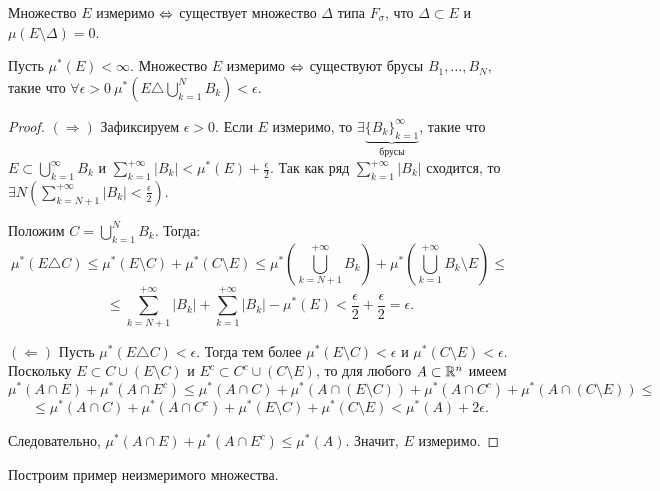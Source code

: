 \begin{note}
    Множество $E$ измеримо $\Leftrightarrow$ существует множество $\Delta$ типа $F_{\sigma}$, что $\Delta \subset E$ и $\mu(E \setminus \Delta) = 0$.
\end{note}

\begin{theorem}
    Пусть $\mu^{*}(E) < \infty$. Множество $E$ измеримо $\Leftrightarrow$ существуют брусы $B_{1}, \ldots, B_{N}$, такие что $\forall \epsilon > 0 \ \mu^{*}(E \triangle \bigcup_{k = 1}^{N} B_{k}) < \epsilon$.
\end{theorem}

\begin{proof}

    $(\Rightarrow)$ Зафиксируем $\epsilon > 0$. Если $E$ измеримо, то $\exists \underbrace{\{B_{k}\}_{k = 1}^{\infty}}_{\text{брусы}}$, такие что $E \subset \bigcup_{k = 1}^{\infty}B_{k}$ и $\sum_{k = 1}^{+\infty}|B_{k}| < \mu^{*}(E) + \frac{\epsilon}{2}$. Так как ряд $\sum_{k = 1}^{+\infty}|B_{k}|$ сходится, то $\exists N \left(\sum_{k = N + 1}^{+\infty}|B_{k}| < \frac{\epsilon}{2}\right)$.

    Положим $C = \bigcup_{k = 1}^{N} B_{k}$. Тогда:
    \[\mu^{*}(E \triangle C) \leq \mu^{*}(E \setminus C) + \mu^{*}(C \setminus E) \leq \mu^{*}\left(\bigcup_{k = N + 1}^{+\infty}B_{k}\right) + \mu^{*}\left(\bigcup_{k = 1}^{+\infty}B_{k} \setminus E\right) \leq\]
    \[\leq \sum_{k = N + 1}^{+\infty}|B_{k}| + \sum_{k = 1}^{+\infty}|B_{k}| - \mu^{*}(E) < \frac{\epsilon}{2} + \frac{\epsilon}{2} = \epsilon.\]

    $(\Leftarrow)$ Пусть $\mu^{*}(E \triangle C) < \epsilon$. Тогда тем более $\mu^{*}(E \setminus C) < \epsilon$ и $\mu^{*}(C \setminus E) < \epsilon$. Поскольку $E \subset C \cup (E \setminus C)$ и $E^{c} \subset C^{c} \cup (C \setminus E)$, то для любого $A \subset \mathbb{R}^{n}$ имеем
    \[\mu^{*}(A \cap E) + \mu^{*}(A \cap E^{c}) \leq \mu^{*}(A \cap C) + \mu^{*}(A \cap (E \setminus C)) + \mu^{*}(A \cap C^{c}) + \mu^{*}(A \cap (C \setminus E)) \leq\]
    \[\leq \mu^{*}(A \cap C) + \mu^{*}(A \cap C^{c}) + \mu^{*}(E \setminus C) + \mu^{*}(C \setminus E) < \mu^{*}(A) + 2\epsilon.\]

    Следовательно, $\mu^{*}(A \cap E) + \mu^{*}(A \cap E^{c}) \leq \mu^{*}(A)$. Значит, $E$ измеримо.
\end{proof}

Построим пример неизмеримого множества.

